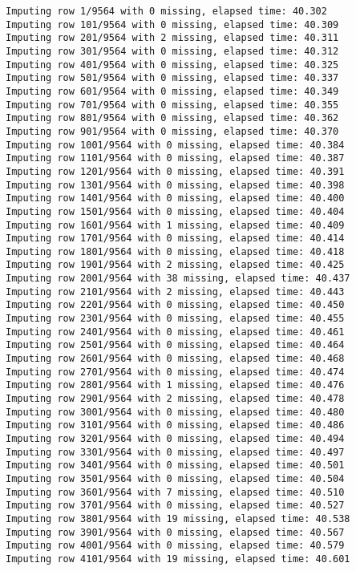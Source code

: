 \documentclass[11pt]{article}
\begin{document}
    \begin{Verbatim}[commandchars=\\\{\}]
Imputing row 1/9564 with 0 missing, elapsed time: 40.302
Imputing row 101/9564 with 0 missing, elapsed time: 40.309
Imputing row 201/9564 with 2 missing, elapsed time: 40.311
Imputing row 301/9564 with 0 missing, elapsed time: 40.312
Imputing row 401/9564 with 0 missing, elapsed time: 40.325
Imputing row 501/9564 with 0 missing, elapsed time: 40.337
Imputing row 601/9564 with 0 missing, elapsed time: 40.349
Imputing row 701/9564 with 0 missing, elapsed time: 40.355
Imputing row 801/9564 with 0 missing, elapsed time: 40.362
Imputing row 901/9564 with 0 missing, elapsed time: 40.370
Imputing row 1001/9564 with 0 missing, elapsed time: 40.384
Imputing row 1101/9564 with 0 missing, elapsed time: 40.387
Imputing row 1201/9564 with 0 missing, elapsed time: 40.391
Imputing row 1301/9564 with 0 missing, elapsed time: 40.398
Imputing row 1401/9564 with 0 missing, elapsed time: 40.400
Imputing row 1501/9564 with 0 missing, elapsed time: 40.404
Imputing row 1601/9564 with 1 missing, elapsed time: 40.409
Imputing row 1701/9564 with 0 missing, elapsed time: 40.414
Imputing row 1801/9564 with 0 missing, elapsed time: 40.418
Imputing row 1901/9564 with 2 missing, elapsed time: 40.425
Imputing row 2001/9564 with 38 missing, elapsed time: 40.437
Imputing row 2101/9564 with 2 missing, elapsed time: 40.443
Imputing row 2201/9564 with 0 missing, elapsed time: 40.450
Imputing row 2301/9564 with 0 missing, elapsed time: 40.455
Imputing row 2401/9564 with 0 missing, elapsed time: 40.461
Imputing row 2501/9564 with 0 missing, elapsed time: 40.464
Imputing row 2601/9564 with 0 missing, elapsed time: 40.468
Imputing row 2701/9564 with 0 missing, elapsed time: 40.474
Imputing row 2801/9564 with 1 missing, elapsed time: 40.476
Imputing row 2901/9564 with 2 missing, elapsed time: 40.478
Imputing row 3001/9564 with 0 missing, elapsed time: 40.480
Imputing row 3101/9564 with 0 missing, elapsed time: 40.486
Imputing row 3201/9564 with 0 missing, elapsed time: 40.494
Imputing row 3301/9564 with 0 missing, elapsed time: 40.497
Imputing row 3401/9564 with 0 missing, elapsed time: 40.501
Imputing row 3501/9564 with 0 missing, elapsed time: 40.504
Imputing row 3601/9564 with 7 missing, elapsed time: 40.510
Imputing row 3701/9564 with 0 missing, elapsed time: 40.527
Imputing row 3801/9564 with 19 missing, elapsed time: 40.538
Imputing row 3901/9564 with 0 missing, elapsed time: 40.567
Imputing row 4001/9564 with 0 missing, elapsed time: 40.579
Imputing row 4101/9564 with 19 missing, elapsed time: 40.601

\end{Verbatim}
\end{document}
